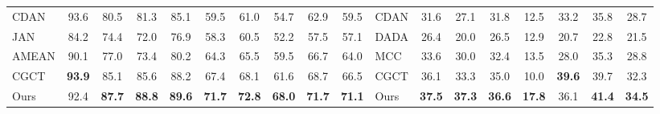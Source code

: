 \documentclass[letterpaper]{article} \usepackage{aaai23}  \usepackage{times}  \usepackage{helvet}  \usepackage{courier}  \usepackage[hyphens]{url}  \usepackage{graphicx} \urlstyle{rm} \def\UrlFont{\rm}  \usepackage{natbib}  \usepackage{caption} \frenchspacing  \setlength{\pdfpagewidth}{8.5in}  \setlength{\pdfpageheight}{11in}
\begin{document}
\begin{table*}[t]
{\begin{tabular}{@{}llcccccccccllccccccc@{}}
\multicolumn{2}{l}{CDAN}                     & 93.6                 & 80.5                 & 81.3                 & \multicolumn{1}{c|}{85.1}          & 59.5                 & 61.0                 & 54.7                 & 62.9                 & \multicolumn{1}{c|}{59.5}          & \multicolumn{2}{l}{CDAN}                     & 31.6                 & 27.1                 & 31.8                 & 12.5                 & 33.2                 & 35.8                 & 28.7                 \\
\multicolumn{2}{l}{JAN}                       & 84.2                 & 74.4                 & 72.0                 & \multicolumn{1}{c|}{76.9}          & 58.3                 & 60.5                 & 52.2                 & 57.5                 & \multicolumn{1}{c|}{57.1}          & \multicolumn{2}{l}{DADA }                     & 26.4                 & 20.0                 & 26.5                 & 12.9                 & 20.7                 & 22.8                 & 21.5                 \\
\multicolumn{2}{l}{AMEAN}                    & 90.1                 & 77.0                 & 73.4                 & \multicolumn{1}{c|}{80.2}          & 64.3                 & 65.5                 & 59.5                 & 66.7                 & \multicolumn{1}{c|}{64.0}          & \multicolumn{2}{l}{MCC}                      & 33.6                 & 30.0                 & 32.4                 & 13.5                 & 28.0                 & 35.3                 & 28.8                 \\
\multicolumn{2}{l}{CGCT}                     & \textbf{93.9}        & 85.1                 & 85.6                 & \multicolumn{1}{c|}{88.2}          & 67.4                 & 68.1                 & 61.6                 & 68.7                 & \multicolumn{1}{c|}{66.5}          & \multicolumn{2}{l}{CGCT}                     & 36.1                 & 33.3                 & 35.0                 & 10.0                 & \textbf{39.6}        & 39.7                 & 32.3                 \\ \midrule
\multicolumn{2}{l}{Ours}                     & 92.4                 & \textbf{87.7}        & \textbf{88.8}        & \multicolumn{1}{c|}{\textbf{89.6}} & \textbf{71.7}        & \textbf{72.8}        & \textbf{68.0}        & \textbf{71.7}        & \multicolumn{1}{c|}{\textbf{71.1}} & \multicolumn{2}{l}{Ours}                     & \textbf{37.5}        & \textbf{37.3}        & \textbf{36.6}        & \textbf{17.8}        & 36.1                 & \textbf{41.4}        & \textbf{34.5}        \\ \midrule 

\end{tabular}}
\end{table*}
\end{document}
